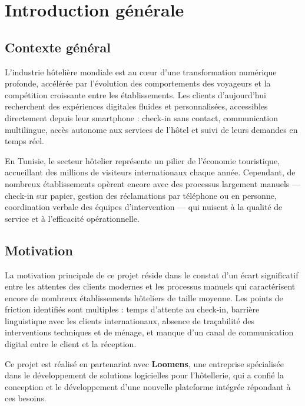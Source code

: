 
\chapter*{Introduction générale}

\section*{Contexte général}

L'industrie hôtelière mondiale est au cœur d'une transformation numérique profonde, accélérée par l'évolution des comportements des voyageurs et la compétition croissante entre les établissements. Les clients d'aujourd'hui recherchent des expériences digitales fluides et personnalisées, accessibles directement depuis leur smartphone : check-in sans contact, communication multilingue, accès autonome aux services de l'hôtel et suivi de leurs demandes en temps réel.

En Tunisie, le secteur hôtelier représente un pilier de l'économie touristique, accueillant des millions de visiteurs internationaux chaque année. Cependant, de nombreux établissements opèrent encore avec des processus largement manuels — check-in sur papier, gestion des réclamations par téléphone ou en personne, coordination verbale des équipes d'intervention — qui nuisent à la qualité de service et à l'efficacité opérationnelle.

\section*{Motivation}

La motivation principale de ce projet réside dans le constat d'un écart significatif entre les attentes des clients modernes et les processus manuels qui caractérisent encore de nombreux établissements hôteliers de taille moyenne. Les points de friction identifiés sont multiples : temps d'attente au check-in, barrière linguistique avec les clients internationaux, absence de traçabilité des interventions techniques et de ménage, et manque d'un canal de communication digital entre le client et la réception.

Ce projet est réalisé en partenariat avec \textbf{Loomens}, une entreprise spécialisée dans le développement de solutions logicielles pour l'hôtellerie, qui a confié la conception et le développement d'une nouvelle plateforme intégrée répondant à ces besoins.

